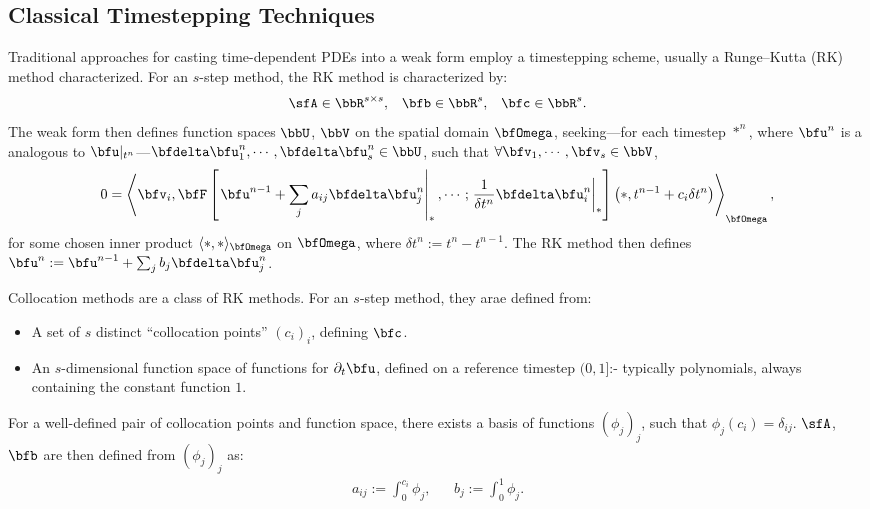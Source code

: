 \subsection{Classical Timestepping Techniques}
    Traditional approaches for casting time-dependent PDEs into a weak form employ a timestepping scheme, usually a Runge--Kutta (RK) method characterized. For an $s$-step method, the RK method is characterized by:
    \begin{align}
        \sfA  \in  \bbR^{s \times s},  &&
        \bfb  \in  \bbR^{s},  &&
        \bfc  \in  \bbR^{s}.
    \end{align}
    The weak form then defines function spaces $\bbU$, $\bbV$ on the spatial domain $\bfOmega$, seeking---for each timestep $*^{n}$, where $\bfu^{n}$ is a analogous to $\bfu|_{t^{n}}$---$\bfdelta\bfu^{n}_{1}, \cdots, \bfdelta\bfu^{n}_{s}  \in  \bbU$, such that $\forall  \bfv_{1}, \cdots, \bfv_{s}  \in  \bbV$,
    \begin{equation}
        0  =  \left\langle\bfv_{i}, \bfF\left[\left.\bfu^{n - 1} + \sum_{j}a_{ij}\bfdelta\bfu^{n}_{j}\right|_{*}, \cdots; \left.\frac{1}{\delta t^{n}}\bfdelta\bfu^{n}_{i}\right|_{*}\right]\left(*, t^{n - 1} + c_{i}\delta t^{n}\right)\right\rangle_{\bfOmega},
    \end{equation}
    for some chosen inner product $\langle*, *\rangle_{\bfOmega}$ on $\bfOmega$, where $\delta t^{n}  :=  t^{n} - t^{n - 1}$. The RK method then defines $\bfu^{n}  :=  \bfu^{n - 1} + \sum_{j}b_{j}\bfdelta\bfu^{n}_{j}$.

    \line
    \begin{definition}
        Collocation methods are a class of RK methods. For an $s$-step method, they arae defined from:
        \begin{itemize}
            \item  A set of $s$ distinct ``collocation points'' $(c_{i})_{i}$, defining $\bfc$.
            \item  An $s$-dimensional function space of functions for $\partial_{t}\bfu$, defined on a reference timestep $(0, 1]$:- typically polynomials, always containing the constant function $1$.
        \end{itemize}
        For a well-defined pair of collocation points and function space, there exists a basis of functions $(\phi_{j})_{j}$, such that $\phi_{j}(c_{i})  =  \delta_{ij}$. $\sfA$, $\bfb$ are then defined from $(\phi_{j})_{j}$ as:
        \begin{align}
            a_{ij}  :=  \int_{0}^{c_{i}}\phi_{j},  &&
            b_{j}   :=  \int_{0}^{1}\phi_{j}.
        \end{align}
    \end{definition}
    
